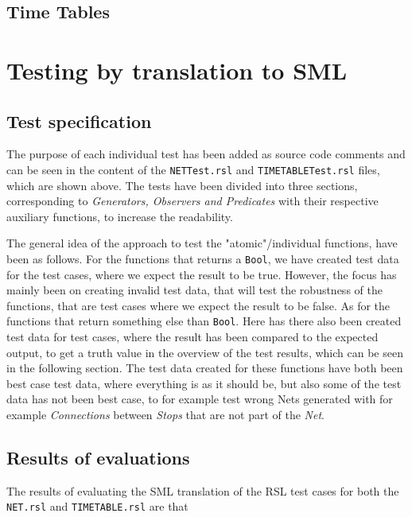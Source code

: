 \documentclass[a4]{article}
\begin{document}
\subsection{Time Tables}



\section{Testing by translation to SML}

\subsection{Test specification}

The purpose of each individual test has been added as source code comments and can be seen in the content of the \verb=NETTest.rsl=  and \verb=TIMETABLETest.rsl= files, which are shown above. The tests have been divided into three sections, corresponding to \emph{Generators, Observers and Predicates} with their respective auxiliary functions, to increase the readability.

The general idea of the approach to test the "atomic"/individual functions, have been as follows. For the functions that returns a \verb=Bool=, we have created test data for the test cases, where we expect the result to be true. However, the focus has mainly been on creating invalid test data, that will test the robustness of the functions, that are test cases where we expect the result to be false. As for the functions that return something else than \verb=Bool=. Here has there also been created test data for test cases, where the result has been compared to the expected output, to get a truth value in the overview of the test results, which can be seen in the following section. The test data created for these functions have both been best case test data, where everything is as it should be, but also some of the test data has not been best case, to for example test wrong Nets generated with for example \emph{Connections} between \emph{Stops} that are not part of the \emph{Net}.

\subsection{Results of evaluations}

The results of evaluating the SML translation of the RSL test cases for both the \verb=NET.rsl= and \verb=TIMETABLE.rsl= are that 
\end{document}
